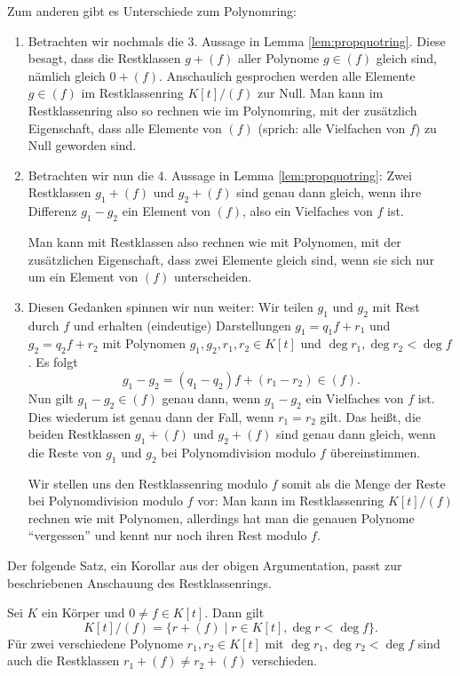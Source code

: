 Zum anderen gibt es Unterschiede zum Polynomring:

\begin{enumerate}
 \item Betrachten wir nochmals die 3. Aussage in Lemma \ref{lem:propquotring}. Diese besagt, dass die Restklassen $g + (f)$ aller Polynome $g \in (f)$ gleich sind, nämlich gleich $0 + (f)$. Anschaulich gesprochen werden alle Elemente $g \in (f)$ im Restklassenring $K[t]/(f)$ zur Null. Man kann im Restklassenring also so rechnen wie im Polynomring, mit der zusätzlich Eigenschaft, dass alle Elemente von $(f)$ (sprich: alle Vielfachen von $f$) zu Null geworden sind.
 \item Betrachten wir nun die 4. Aussage in Lemma \ref{lem:propquotring}: Zwei Restklassen $g_1 + (f)$ und $g_2 + (f)$ sind genau dann gleich, wenn ihre Differenz $g_1 - g_2$ ein Element von $(f)$, also ein Vielfaches von $f$ ist. 
 
 Man kann mit Restklassen also rechnen wie mit Polynomen, mit der zusätzlichen Eigenschaft, dass zwei Elemente gleich sind, wenn sie sich nur um ein Element von $(f)$ unterscheiden. 
 
 \item Diesen Gedanken spinnen wir nun weiter: Wir teilen $g_1$ und $g_2$ mit Rest durch $f$ und erhalten (eindeutige) Darstellungen $g_1 = q_1f + r_1$ und $g_2 = q_2f + r_2$ mit Polynomen $g_1, g_2, r_1, r_2 \in K[t]$ und $\deg r_1, \deg r_2 < \deg f$. Es folgt 
 \[g_1 - g_2 = (q_1 - q_2)f + (r_1 - r_2) \in (f).\]
 Nun gilt $g_1 - g_2 \in (f)$ genau dann, wenn $g_1 - g_2$ ein Vielfaches von $f$ ist. Dies wiederum ist genau dann der Fall, wenn $r_1 = r_2$ gilt. Das heißt, die beiden Restklassen $g_1 + (f)$ und $g_2 + (f)$ sind genau dann gleich, wenn die Reste von $g_1$ und $g_2$ bei Polynomdivision modulo $f$ übereinstimmen.

 Wir stellen uns den Restklassenring modulo $f$ somit als die Menge der Reste bei Polynomdivision modulo $f$ vor: Man kann im Restklassenring $K[t]/(f)$ rechnen wie mit Polynomen, allerdings hat man die genauen Polynome \enquote{vergessen} und kennt nur noch ihren Rest modulo $f$.
\end{enumerate}

Der folgende Satz, ein Korollar aus der obigen Argumentation, passt zur beschriebenen Anschauung des Restklassenrings.

\begin{theorem}\label{thm:elementsquotring}
 Sei $K$ ein Körper und $0 ≠ f \in K[t]$. Dann gilt
 \[K[t]/(f) = \{r + (f)\mid r \in K[t], \deg r < \deg f\}.\]
 Für zwei verschiedene Polynome $r_1, r_2 \in K[t]$ mit $\deg r_1, \deg r_2 < \deg f$ sind auch die Restklassen $r_1 + (f) ≠ r_2 + (f)$ verschieden.
\end{theorem}

